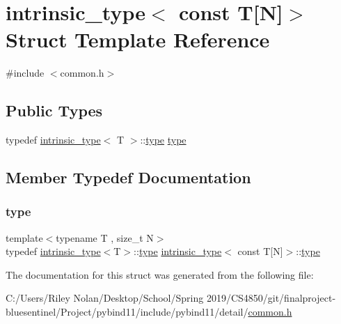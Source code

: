 \hypertarget{structintrinsic__type_3_01const_01_t[_n]_4}{}\section{intrinsic\+\_\+type$<$ const T\mbox{[}N\mbox{]}$>$ Struct Template Reference}
\label{structintrinsic__type_3_01const_01_t[_n]_4}


{\ttfamily \#include $<$common.\+h$>$}

\subsection*{Public Types}
\begin{DoxyCompactItemize}
\item 
typedef \mbox{\hyperlink{structintrinsic__type}{intrinsic\+\_\+type}}$<$ T $>$\+::\mbox{\hyperlink{structintrinsic__type_3_01const_01_t[_n]_4_a7b6f6511109ee2c22f02ca0fd976b3cc}{type}} \mbox{\hyperlink{structintrinsic__type_3_01const_01_t[_n]_4_a7b6f6511109ee2c22f02ca0fd976b3cc}{type}}
\end{DoxyCompactItemize}


\subsection{Member Typedef Documentation}
\mbox{\label{structintrinsic__type_3_01const_01_t[_n]_4_a7b6f6511109ee2c22f02ca0fd976b3cc}} 
\subsubsection{\texorpdfstring{type}{type}}
{\footnotesize\ttfamily template$<$typename T , size\+\_\+t N$>$ \\
typedef \mbox{\hyperlink{structintrinsic__type}{intrinsic\+\_\+type}}$<$T$>$\+::\mbox{\hyperlink{structintrinsic__type_3_01const_01_t[_n]_4_a7b6f6511109ee2c22f02ca0fd976b3cc}{type}} \mbox{\hyperlink{structintrinsic__type}{intrinsic\+\_\+type}}$<$ const T\mbox{[}N\mbox{]}$>$\+::\mbox{\hyperlink{structintrinsic__type_3_01const_01_t[_n]_4_a7b6f6511109ee2c22f02ca0fd976b3cc}{type}}}



The documentation for this struct was generated from the following file\+:\begin{DoxyCompactItemize}
\item 
C\+:/\+Users/\+Riley Nolan/\+Desktop/\+School/\+Spring 2019/\+C\+S4850/git/finalproject-\/bluesentinel/\+Project/pybind11/include/pybind11/detail/\mbox{\hyperlink{detail_2common_8h}{common.\+h}}\end{DoxyCompactItemize}
